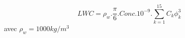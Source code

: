 \[
LWC = \rho_w .\frac{\pi}{6}. Conc .10^{-9}.
      \sum_{k=1}^{15} C_k \phi^3_k
\]
avec $\rho_w = 1000 kg/m^3$


